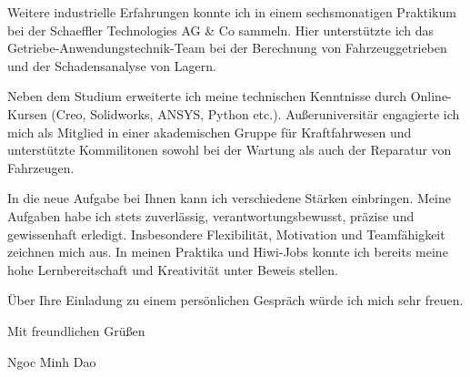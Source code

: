 \documentclass[11pt,a4paper]{letter}
\begin{document}
Weitere industrielle Erfahrungen konnte ich in einem sechsmonatigen Praktikum bei der Schaeffler Technologies AG \& Co sammeln.
Hier unterstützte ich das Getriebe-Anwendungstechnik-Team bei der Berechnung von Fahrzeuggetrieben und der Schadensanalyse von Lagern.

Neben dem Studium erweiterte ich meine technischen Kenntnisse durch Online-Kursen (Creo, Solidworks, ANSYS, Python etc.).
Außeruniversitär engagierte ich mich als Mitglied in einer akademischen Gruppe für Kraftfahrwesen und unterstützte Kommilitonen sowohl bei der Wartung als auch der Reparatur von Fahrzeugen.

In die neue Aufgabe bei Ihnen kann ich verschiedene Stärken einbringen.
Meine Aufgaben habe ich stets zuverlässig, verantwortungsbewusst, präzise und gewissenhaft erledigt.
Insbesondere Flexibilität, Motivation und Teamfähigkeit zeichnen mich aus.
In meinen Praktika und Hiwi-Jobs konnte ich bereits meine hohe Lernbereitschaft und Kreativität unter Beweis stellen.

Über Ihre Einladung zu einem persönlichen Gespräch würde ich mich sehr freuen.

\vspace{1em}

Mit freundlichen Grüßen

Ngoc Minh Dao
\end{document}
